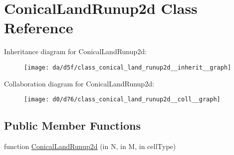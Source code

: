 \hypertarget{class_conical_land_runup2d}{}\section{Conical\+Land\+Runup2d Class Reference}
\label{class_conical_land_runup2d}


Inheritance diagram for Conical\+Land\+Runup2d\+:
\nopagebreak
\begin{figure}[H]
\begin{center}
\leavevmode
\texttt{[image: da/d5f/class\_conical\_land\_runup2d\_\_inherit\_\_graph]}
\end{center}
\end{figure}


Collaboration diagram for Conical\+Land\+Runup2d\+:
\nopagebreak
\begin{figure}[H]
\begin{center}
\leavevmode
\texttt{[image: d0/d76/class\_conical\_land\_runup2d\_\_coll\_\_graph]}
\end{center}
\end{figure}
\subsection*{Public Member Functions}
\begin{DoxyCompactItemize}
\item 
function \hyperlink{class_conical_land_runup2d_ad76aaaab5eb7de38189bfb8e5846ee34}{Conical\+Land\+Runup2d} (in N, in M, in cell\+Type)
\end{DoxyCompactItemize}
